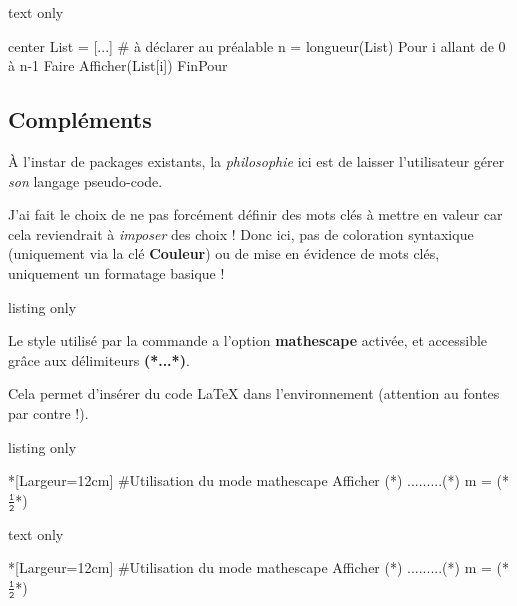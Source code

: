 \documentclass[a4paper,french,11pt]{article}
\newcommand\ctex[1]{\tcbox[vignettelatex]{#1}}
\newcommand\Cle[1]{{\bfseries\sffamily\textlangle \textcolor{orange!75!black}{#1}\textrangle}}
\begin{document}
\begin{PresCodeSortiePL}{text only}
\begin{PseudoCodeAlt}[Largeur=15cm,PremLigne=7,Couleur]{center}
List = [...]          # à déclarer au préalable
n = longueur(List)
Pour i allant de 0 à n-1 Faire
	Afficher(List[i])
FinPour
\end{PseudoCodeAlt}
\end{PresCodeSortiePL}

\subsection{Compléments}

\begin{warningblock}
À l'instar de packages existants, la \textit{philosophie} ici est de laisser l'utilisateur gérer \textit{son} langage pseudo-code.

J'ai fait le choix de ne pas forcément définir des \textsf{mots clés} à mettre en valeur car cela reviendrait à \textit{imposer} des choix ! Donc ici, pas de coloration syntaxique (uniquement via la clé \Cle{Couleur}) ou de mise en évidence de mots clés, uniquement un formatage basique !
\end{warningblock}

\begin{PresCodeTexPL}{listing only}
\end{PresCodeTexPL}

\begin{noteblock}
Le style \ctex{listings} utilisé par la commande a l'option \Cle{mathescape} activée, et accessible grâce aux délimiteurs \Cle{(*...*)}.

Cela permet d'insérer du code \LaTeX{} dans l'environnement \ctex{PseudoCode} (attention au fontes par contre !).
\end{noteblock}

\begin{PresCodeTexPL}{listing only}
\begin{PseudoCode}*[Largeur=12cm]{} %
#Utilisation du mode mathescape
Afficher (*\og*) .........(*\fg*)
m = (*$\tfrac{\texttt{1}}{\texttt{2}}$*)
\end{PseudoCode}
\end{PresCodeTexPL}

\begin{PresCodeSortiePL}{text only}
\begin{PseudoCode}*[Largeur=12cm]{}
#Utilisation du mode mathescape
Afficher (*\og*) .........(*\fg*)
m = (*$\tfrac{\texttt{1}}{\texttt{2}}$*)
\end{PseudoCode}
\end{PresCodeSortiePL}
\end{document}
